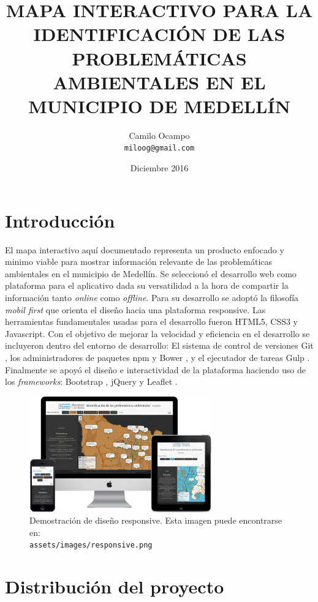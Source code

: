 \documentclass[11pt,letterpaper]{article}
\author
{
	Camilo Ocampo\\
 	{\tt miloog@gmail.com}
}
\title{\bf MAPA INTERACTIVO PARA LA IDENTIFICACIÓN DE LAS PROBLEMÁTICAS AMBIENTALES EN EL MUNICIPIO DE MEDELLÍN}
\date{Diciembre 2016}
\begin{document}
\maketitle

\section{Introducción}
El mapa interactivo aquí documentado representa un producto enfocado y minimo viable para mostrar información relevante de las problemáticas ambientales en el municipio de Medellín. Se seleccionó el desarrollo web como plataforma para el aplicativo dada su versatilidad a la hora de compartir la información tanto {\it online} como {\it offline}. Para su desarrollo se adoptó la filosofía {\it mobil first} que orienta el diseño hacia una plataforma responsive. Las herramientas fundamentales usadas para el desarrollo fueron HTML5, CSS3 y Javascript. Con el objetivo de mejorar la velocidad y eficiencia en el desarrollo se incluyeron dentro del entorno de desarrollo: El sistema de control de versiones Git \cite{git}, los administradores de paquetes npm \cite{npm} y Bower \cite{bower}, y el ejecutador de tareas Gulp \cite{gulp}. Finalmente se apoyó el diseño e interactividad de la plataforma haciendo uso de los {\it frameworks}: Bootstrap \cite{bootstrap}, jQuery y Leaflet \cite{leaflet}.
\vspace{1cm}
\begin{figure}[ht]
\centering
\includegraphics[width=0.7\textwidth]{../assets/images/responsive.png}
\caption{Demostración de diseño responsive. Esta imagen puede encontrarse en:\\ {\tt assets/images/responsive.png}}\label{fig:responsive}
\end{figure}

\section{Distribución del proyecto}
\end{document}
